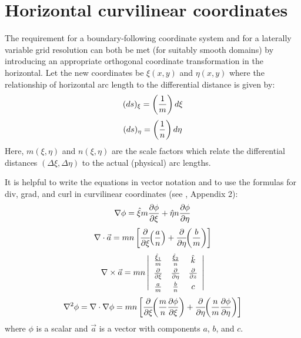 \section{Horizontal curvilinear coordinates}
\label{Curve}
The requirement for a boundary-following coordinate system and for a
laterally variable grid resolution can both be met (for suitably
smooth domains) by introducing an appropriate orthogonal coordinate
transformation in the horizontal.  Let the new coordinates be
$\xi(x,y)$ and $\eta(x,y)$ where the relationship of horizontal arc
length to the differential distance is given by:
\begin{equation}
   (ds)_{\xi} = \left( {1 \over m} \right) d \xi
\end{equation}
\begin{equation}
   (ds)_{\eta} = \left( {1 \over n} \right) d \eta
\end{equation}
Here, $m(\xi,\eta)$ and $n(\xi,\eta)$ are the scale factors which
relate the differential distances $(\Delta \xi,\Delta \eta)$ to the
actual (physical) arc lengths.

It is helpful to write the equations in vector notation and to use
the formulas for div, grad, and curl in curvilinear coordinates (see
\cite{Batchelor}, Appendix 2):
\begin{equation}
   \nabla \phi = \hat{\xi} m {\partial \phi \over \partial \xi} +
                 \hat{\eta} n {\partial \phi \over \partial \eta}
\end{equation}
\begin{equation}
   \nabla \cdot \vec{a} = mn \left[
   {\partial \over \partial \xi} \!\! \left( {a \over n} \right) +
   {\partial \over \partial \eta} \!\! \left( {b \over m} \right)
   \right]
\end{equation}
\begin{equation}
   \nabla \times \vec{a} = mn \left| \begin{array}{ccc}
   \vspace{1 mm}
   {\hat{\xi}_1 \over m} & {\hat{\xi}_2 \over n} & \hat{k} \\
   \vspace{1 mm}
   {\partial \over \partial \xi} &
   {\partial \over \partial \eta} &
   {\partial \over \partial z} \\
   {a \over m} & {b \over n} & c
   \end{array} \right|
\end{equation}
\begin{equation}
   \nabla^2 \phi = \nabla \cdot \nabla \phi = mn \left[ 
   {\partial \over \partial \xi} \!\! \left( {m \over n} 
   {\partial \phi \over \partial \xi} \right) +
   {\partial \over \partial \eta} \!\! \left( {n \over m} 
   {\partial \phi \over \partial \eta} \right) \right]
\end{equation}
where $\phi$ is a scalar and $\vec{a}$ is a vector with components
$a$, $b$, and $c$.
